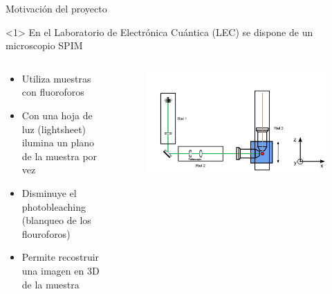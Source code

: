
\begin{frame}[t]{Motivación del proyecto}

    \begin{onlyenv}<1>
    En el Laboratorio de Electrónica Cuántica (LEC) se dispone de un microscopio SPIM

    \begin{columns}
        \begin{column}{0.5\textwidth}
            \begin{itemize}
                \item Utiliza muestras con fluoroforos
                \item Con una hoja de luz (lightsheet) ilumina un plano de la muestra por vez
                \item Disminuye el photobleaching (blanqueo de los flouroforos)
                \item Permite recostruir una imagen en 3D de la muestra
            \end{itemize}
        \end{column}
        \begin{column}{0.5\textwidth}
            \begin{figure}[H]
                \centering
                \includegraphics[width=\textwidth]{fig/spim}
                \label{fig:spim} 
            \end{figure}
        \end{column}
        \end{columns}
    \end{onlyenv}


\end{frame}
